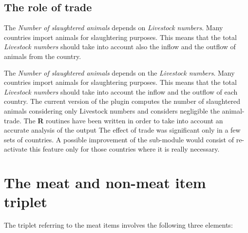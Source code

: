 \documentclass[nojss]{jss}
\begin{document}
\subsection{The role of trade}

The \textit{Number of slaughtered animals} depends on \textit{Livestock numbers}. Many countries import animals for slaughtering purposes. This means that the total \textit{Livestock numbers} should take into account also the inflow and the outflow of animals from the country.



The \textit{Number of slaughtered animals} depends on the \textit{Livestock numbers}. Many countries import animals
for slaughtering purposes. This means that the total \textit{Livestock numbers} should take
into account the inflow and the outflow of each country. The current version of the plugin
computes the number of slaughtered animals considering only Livestock numbers and considers
negligible the animal-trade. The \textbf{R} routines have been written in order to take into account
an accurate analysis of the output
The effect of trade was significant only in a few sets of countries. A possible improvement of
the sub-module would consist of re-activate this feature only for those countries where it is
really necessary.


\section{The meat and non-meat item triplet}
The triplet referring to the meat items involves the following three elements:
\end{document}

